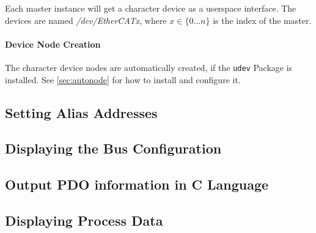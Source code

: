 \documentclass[a4paper,12pt,BCOR6mm,bibtotoc,idxtotoc]{scrbook}
\begin{document}
Each master instance will get a character device as a userspace interface.
The devices are named \textit{/dev/EtherCATx}, where $x \in \{0 \ldots n\}$ is
the index of the master.

\paragraph{Device Node Creation} The character device nodes are automatically
created, if the \lstinline+udev+ Package is installed. See
\autoref{sec:autonode} for how to install and configure it.


\subsection{Setting Alias Addresses}
\label{sec:ethercat-alias}




\subsection{Displaying the Bus Configuration}
\label{sec:ethercat-config}




\subsection{Output PDO information in C Language}
\label{sec:ethercat-cstruct}




\subsection{Displaying Process Data}


\end{document}
